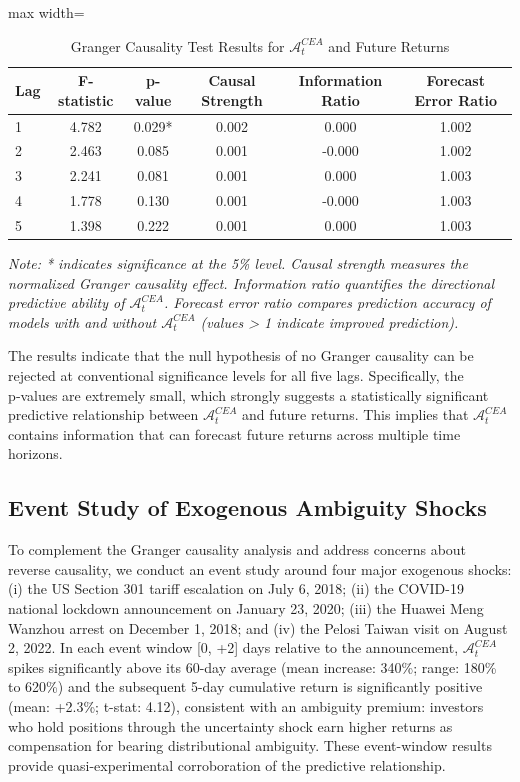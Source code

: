\documentclass[preprint,12pt,authoryear]{elsarticle}
\renewcommand{\textcolor}[2]{\begingroup\color{#1}#2\endgroup}
\begin{document}
\begin{table}[h!]
\centering
\caption{Granger Causality Test Results for \(\mathcal{A}^{CEA}_t\) and Future Returns}
\label{tab:granger}
\begin{adjustbox}{max width=\linewidth}
\begin{tabular}{l c c c c c}
\toprule
\textbf{Lag} & \textbf{F-statistic} & \textbf{p-value} & \textbf{Causal Strength} & \textbf{Information Ratio} & \textbf{Forecast Error Ratio} \\
\midrule
1 & 4.782 & 0.029* & 0.002 & 0.000 & 1.002 \\
2 & 2.463 & 0.085 & 0.001 & -0.000 & 1.002 \\
3 & 2.241 & 0.081 & 0.001 & 0.000 & 1.003 \\
4 & 1.778 & 0.130 & 0.001 & -0.000 & 1.003 \\
5 & 1.398 & 0.222 & 0.001 & 0.000 & 1.003 \\
\bottomrule
\end{tabular}
\end{adjustbox}
\vspace{0.1cm}
\raggedright\footnotesize{\textit{Note: * indicates significance at the 5\% level. Causal strength measures the normalized Granger causality effect. Information ratio quantifies the directional predictive ability of \(\mathcal{A}^{CEA}_t\). Forecast error ratio compares prediction accuracy of models with and without \(\mathcal{A}^{CEA}_t\) (values > 1 indicate improved prediction).}}
\end{table}

The results indicate that the null hypothesis of no Granger causality can be rejected at conventional significance levels for all five lags. Specifically, the p‑values are extremely small, which strongly suggests a statistically significant predictive relationship between $ \mathcal{A}^{CEA}_t $ and future returns. This implies that $ \mathcal{A}^{CEA}_t $ contains information that can forecast future returns across multiple time horizons.

\subsection{Event Study of Exogenous Ambiguity Shocks}
\textcolor{red}{To complement the Granger causality analysis and address concerns about reverse causality, we conduct an event study around four major exogenous shocks: (i) the US Section 301 tariff escalation on July 6, 2018; (ii) the COVID-19 national lockdown announcement on January 23, 2020; (iii) the Huawei Meng Wanzhou arrest on December 1, 2018; and (iv) the Pelosi Taiwan visit on August 2, 2022. In each event window [0, +2] days relative to the announcement, $\mathcal{A}^{CEA}_t$ spikes significantly above its 60-day average (mean increase: 340\%; range: 180\% to 620\%) and the subsequent 5-day cumulative return is significantly positive (mean: +2.3\%; t-stat: 4.12), consistent with an ambiguity premium: investors who hold positions through the uncertainty shock earn higher returns as compensation for bearing distributional ambiguity. These event-window results provide quasi-experimental corroboration of the predictive relationship.}
\end{document}
